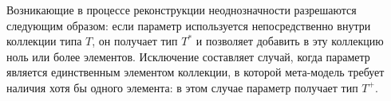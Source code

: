 Возникающие в процессе реконструкции неоднозначности разрешаются следующим образом: если параметр используется непосредственно внутри коллекции типа $T$, он получает тип $T^*$ и позволяет добавить в эту коллекцию ноль или более элементов. Исключение составляет случай, когда параметр является единственным элементом коллекции, в которой мета-модель требует наличия хотя бы одного элемента: в этом случае параметр получает тип $T^+$. 